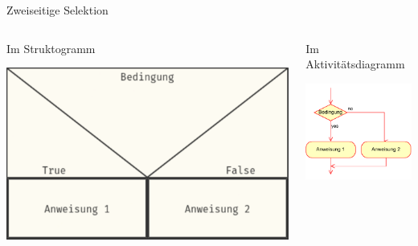 \documentclass[xelatex,aspectratio=169]{beamer}
\begin{document}
\begin{frame}{Zweiseitige Selektion}

  \begin{columns}[t]
    \begin{column}{.4\linewidth}
      \begin{block}{Im Struktogramm}
        \begin{minipage}[c][.7\textheight][c]{\textwidth}
          \centering
          \includegraphics[width=\textwidth]{fig/algorithmus_zweiseitige_selektion_struktogram.pdf}
        \end{minipage}
      \end{block}
    \end{column}
    \begin{column}{.3\linewidth}
      \begin{block}{Im Aktivitätsdiagramm}
        \begin{minipage}[c][.7\textheight][c]{\textwidth}
          \centering
          \includegraphics[width=\textwidth]{fig/algorithmus_zweiseitige_selektion_aktivitaetsdiagram.drawio.pdf}
        \end{minipage}
      \end{block}


\end{column}
\end{columns}
\end{frame}
\end{document}
